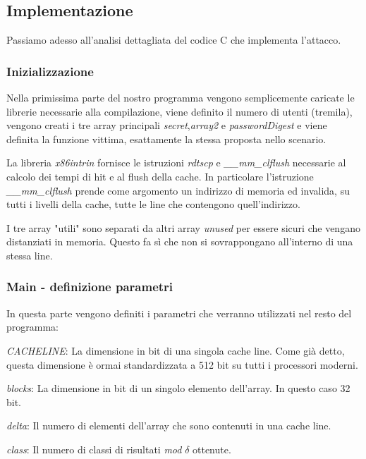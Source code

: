 			\subsection{Implementazione}
				Passiamo adesso all'analisi dettagliata del codice C che implementa l'attacco.
				
				\subsubsection{Inizializzazione}
				
				Nella primissima parte del nostro programma vengono semplicemente caricate le librerie necessarie alla compilazione, viene definito il numero di utenti (tremila), vengono creati i tre array principali \emph{secret},\emph{array2} e \emph{passwordDigest} e viene definita la funzione vittima, esattamente la stessa proposta nello scenario.
				
 				La libreria \emph{x86intrin} fornisce le istruzioni \emph{rdtscp} e \emph{\_\_mm\_clflush} necessarie al calcolo dei tempi di hit e al flush della cache. In particolare l'istruzione \emph{\_\_mm\_clflush} prende come argomento un indirizzo di memoria ed invalida, su tutti i livelli della cache, tutte le line che contengono quell'indirizzo.
				
				I tre array "utili" sono separati da altri array \emph{unused} per essere sicuri che vengano distanziati in memoria. Questo fa sì che non si sovrappongano all'interno di una stessa line.
				
				\subsubsection{Main - definizione parametri}
				
				In questa parte vengono definiti i parametri che verranno utilizzati nel resto del programma:

					\emph{CACHELINE}: La dimensione in bit di una singola cache line. Come già detto, questa dimensione è ormai standardizzata a 512 bit su tutti i processori moderni.
					
					\emph{blocks}: La dimensione in bit di un singolo elemento dell'array. In questo caso 32 bit.
					
					\emph{delta}: Il numero di elementi dell'array che sono contenuti in una cache line.
					
					\emph{class}: Il numero di classi di risultati \emph{mod} $\delta$ ottenute.
					
